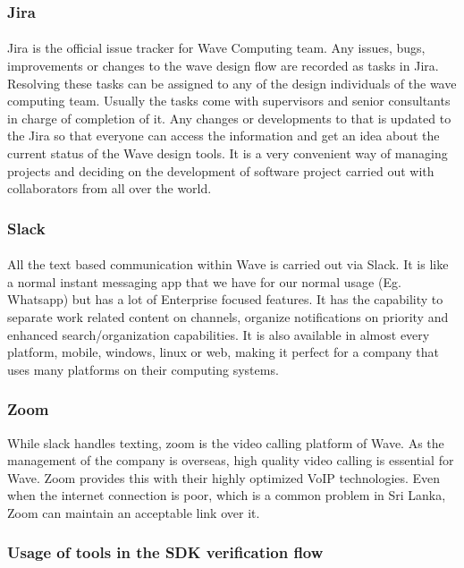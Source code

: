 \subsubsection{Jira}
\paragraph{}
Jira is the official issue tracker for Wave Computing team. Any issues, bugs, improvements or changes to the wave design flow are recorded as tasks in Jira. Resolving these tasks can be assigned to any of the design individuals of the wave computing team. Usually the tasks come with supervisors and senior consultants in charge of completion of it. Any changes or developments to that is updated to the Jira so that everyone can access the information and get an idea about the current status of the Wave design tools. It is a very convenient way of managing projects and deciding on the development of software project carried out with collaborators from all over the world. 

\subsubsection{Slack}
\paragraph{}
All the text based communication within Wave is carried out via Slack. It is like a normal instant messaging app that we have for our normal usage (Eg. Whatsapp) but has a lot of Enterprise focused features. It has the capability to separate work related content on channels, organize notifications on priority and enhanced search/organization capabilities. It is also available in almost every platform, mobile, windows, linux or web, making it perfect for a company that uses many platforms on their computing systems.

\subsubsection{Zoom}
While slack handles texting, zoom is the video calling platform of Wave. As the management of the company is overseas, high quality video calling is essential for Wave. Zoom provides this with their highly optimized VoIP technologies. Even when the internet connection is poor, which is a common problem in Sri Lanka, Zoom can maintain an acceptable link over it. 

\subsubsection{Usage of tools in the SDK verification flow}
